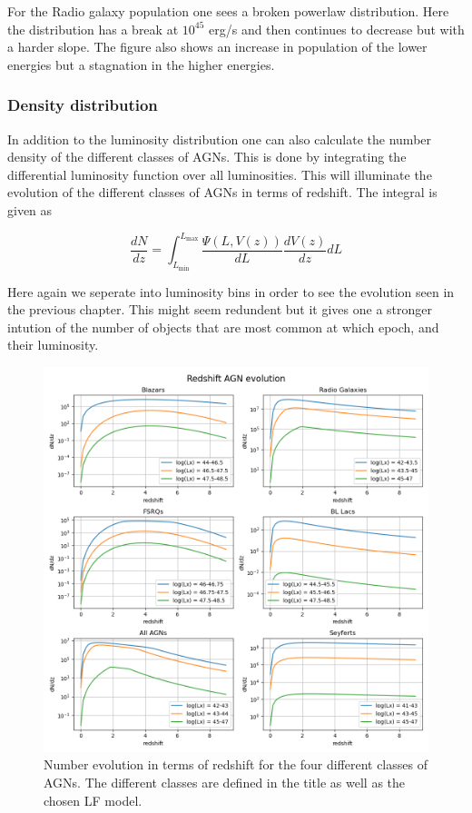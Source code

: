 \documentclass{article}
\begin{document}
For the Radio galaxy population one sees a broken powerlaw distribution. Here the distribution has a break at $10^{45}$ erg/s and then continues to 
decrease but with a harder slope. The figure also shows an increase in population of the lower energies but a stagnation in the higher energies. 


\subsubsection{Density distribution}

In addition to the luminosity distribution one can also calculate the number density of the different classes of AGNs. This is done by integrating the
differential luminosity function over all luminosities. This will illuminate the evolution of the different classes of AGNs in terms of redshift. The integral is given as

\begin{equation}
    \frac{dN}{dz} = \int_{L_{\text{min}}}^{L_{\text{max}}} \frac{\Psi(L, V(z))}{dL} \frac{dV(z)}{dz} dL
\end{equation}

Here again we seperate into luminosity bins in order to see the evolution seen in the previous chapter. This might seem redundent but
it gives one a stronger intution of the number of objects that are most common at which epoch, and their luminosity. 





\begin{figure}
    \centering
    \includegraphics[width = \textwidth]{new_plots/Redshift AGN evolution.png}
    \caption{Number evolution in terms of redshift for the four different classes of AGNs. The different classes are defined in the title as well as the chosen LF model.}
    \label{fig:ND}
\end{figure}
\end{document}
